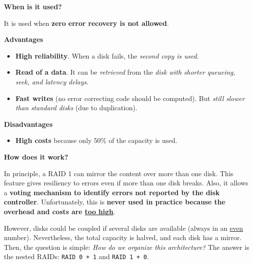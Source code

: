 \begin{flushleft}
    \textcolor{Green3}{ \textbf{When is it used?}}
\end{flushleft}
It is used when \textbf{zero error recovery is not allowed}.

\highspace
\begin{flushleft}
    \textcolor{Green3}{ \textbf{Advantages}}
\end{flushleft}
\begin{itemize}
    \item \textbf{High reliability}. When a disk fails, the \emph{second copy is used}.
    \item \textbf{Read of a data}. It can be \emph{retrieved} from the \emph{disk with shorter queueing, seek, and latency delays}.
    \item \textbf{Fast writes} (no error correcting code should be computed). But \emph{still slower than standard disks} (due to duplication).
\end{itemize}

\highspace
\begin{flushleft}
    \textcolor{Red2}{ \textbf{Disadvantages}}
\end{flushleft}
\begin{itemize}
    \item \textbf{High costs} because only 50\% of the capacity is used.
\end{itemize}

\highspace
\begin{flushleft}
    \textcolor{Green3}{ \textbf{How does it work?}}
\end{flushleft}
In principle, a RAID 1 can mirror the content over more than one disk. This feature gives resiliency to errors even if more than one disk breaks. Also, it allows a \textbf{voting mechanism to identify errors not reported by the disk controller}. Unfortunately, this is \textbf{never used in practice because the overhead and costs are \underline{too high}}.

\highspace
However, disks could be coupled if several disks are available (always in an \underline{even} number). Nevertheless, the total capacity is halved, and each disk has a mirror. Then, the question is simple: \emph{How do we organize this architecture?} The answer is the nested RAIDs: \texttt{RAID 0 + 1} and \texttt{RAID 1 + 0}.

